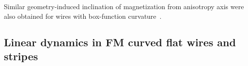Similar geometry-induced inclination of magnetization from anisotropy axis were also obtained for wires with box-function curvature~\cite{Gaididei18a}.


\subsection{Linear dynamics in FM curved flat wires and stripes}\label{sec:linear_dyn}


